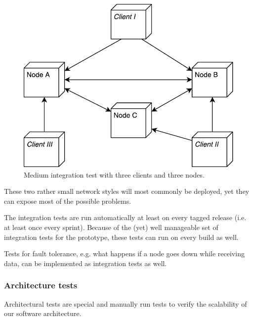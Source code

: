 \begin{figure}
	\centering
	\includegraphics[width=0.5\linewidth]{resources/integration_test_medium}
	\caption[Medium integration test]{Medium integration test with three \glspl{client} and three \glspl{node}.}
	\label{fig:integrationtestmedium}
\end{figure}

These two rather small network styles will most commonly be deployed, yet they can expose most of the possible problems.

The integration tests are run automatically at least on every tagged release (i.e. at least once every sprint). Because of the (yet) well manageable set of integration tests for the prototype, these tests can run on every build as well.

Tests for fault tolerance, e.g. what happens if a \gls{node} goes down while receiving data, can be implemented as integration tests as well.

\subsubsection{Architecture tests}

Architectural tests are special and manually run tests to verify the scalability of our software architecture.